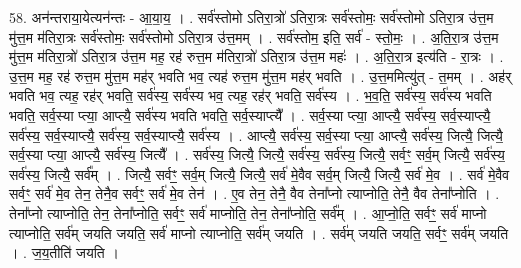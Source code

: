 \documentclass[17pt]{extarticle}
\begin{document}
58. अन॑न्तराया॒येत्यन॑न्तः - आ॒या॒य॒ । . सर्व॑स्तोमो ऽतिरा॒त्रो॑ ऽतिरा॒त्रः सर्व॑स्तोमः॒ सर्व॑स्तोमो ऽतिरा॒त्र उ॑त्त॒म मु॑त्त॒म म॑तिरा॒त्रः सर्व॑स्तोमः॒ सर्व॑स्तोमो ऽतिरा॒त्र उ॑त्त॒मम् । . सर्व॑स्तोम॒ इति॒ सर्व॑ - स्तो॒मः॒ । . अ॒ति॒रा॒त्र उ॑त्त॒म मु॑त्त॒म म॑तिरा॒त्रो॑ ऽतिरा॒त्र उ॑त्त॒म मह॒ रह॑ रुत्त॒म म॑तिरा॒त्रो॑ ऽतिरा॒त्र उ॑त्त॒म महः॑ । . अ॒ति॒रा॒त्र इत्य॑ति - रा॒त्रः । . उ॒त्त॒म मह॒ रह॑ रुत्त॒म मु॑त्त॒म मह॑र् भवति भव॒ त्यह॑ रुत्त॒म मु॑त्त॒म मह॑र् भवति । . उ॒त्त॒ममित्यु॑त् - त॒मम् । . अह॑र् भवति भव॒ त्यह॒ रह॑र् भवति॒ सर्व॑स्य॒ सर्व॑स्य भव॒ त्यह॒ रह॑र् भवति॒ सर्व॑स्य । . भ॒व॒ति॒ सर्व॑स्य॒ सर्व॑स्य भवति भवति॒ सर्व॒स्या प्त्या॒ आप्त्यै॒ सर्व॑स्य भवति भवति॒ सर्व॒स्याप्त्यै᳚ । . सर्व॒स्या प्त्या॒ आप्त्यै॒ सर्व॑स्य॒ सर्व॒स्याप्त्यै॒ सर्व॑स्य॒ सर्व॒स्याप्त्यै॒ सर्व॑स्य॒ सर्व॒स्याप्त्यै॒ सर्व॑स्य । . आप्त्यै॒ सर्व॑स्य॒ सर्व॒स्या प्त्या॒ आप्त्यै॒ सर्व॑स्य॒ जित्यै॒ जित्यै॒ सर्व॒स्या प्त्या॒ आप्त्यै॒ सर्व॑स्य॒ जित्यै᳚ । . सर्व॑स्य॒ जित्यै॒ जित्यै॒ सर्व॑स्य॒ सर्व॑स्य॒ जित्यै॒ सर्वꣳ॒॒ सर्व॒म् जित्यै॒ सर्व॑स्य॒ सर्व॑स्य॒ जित्यै॒ सर्व᳚म् । . जित्यै॒ सर्वꣳ॒॒ सर्व॒म् जित्यै॒ जित्यै॒ सर्व॑ मे॒वैव सर्व॒म् जित्यै॒ जित्यै॒ सर्व॑ मे॒व । . सर्व॑ मे॒वैव सर्वꣳ॒॒ सर्व॑ मे॒व तेन॒ तेनै॒व सर्वꣳ॒॒ सर्व॑ मे॒व तेन॑ । . ए॒व तेन॒ तेनै॒ वैव तेना᳚प्नो त्याप्नोति॒ तेनै॒ वैव तेना᳚प्नोति । . तेना᳚प्नो त्याप्नोति॒ तेन॒ तेना᳚प्नोति॒ सर्वꣳ॒॒ सर्व॑ माप्नोति॒ तेन॒ तेना᳚प्नोति॒ सर्व᳚म् । . आ॒प्नो॒ति॒ सर्वꣳ॒॒ सर्व॑ माप्नो त्याप्नोति॒ सर्व॑म् जयति जयति॒ सर्व॑ माप्नो त्याप्नोति॒ सर्व॑म् जयति । . सर्व॑म् जयति जयति॒ सर्वꣳ॒॒ सर्व॑म् जयति । . ज॒य॒तीति॑ जयति । \newline
\pagebreak
\end{document}
